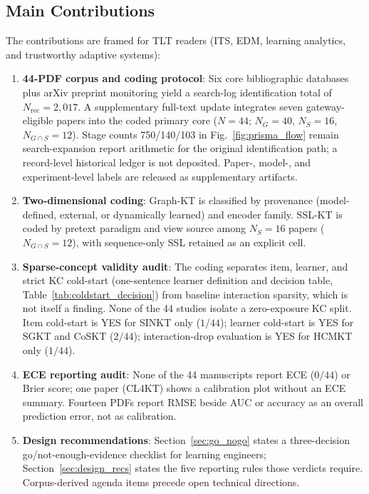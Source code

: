 \documentclass[lettersize,journal]{IEEEtran}
\begin{document}
\subsection{Main Contributions}
The contributions are framed for TLT readers (ITS, EDM, learning analytics, and trustworthy adaptive systems):
\begin{enumerate}
    \item \textbf{44-PDF corpus and coding protocol}: Six core bibliographic databases plus arXiv preprint monitoring yield a search-log identification total of $N_{\mathrm{rec}}=2{,}017$. A supplementary full-text update integrates seven gateway-eligible papers into the coded primary core ($N=44$; $N_G=40$, $N_S=16$, $N_{G \cap S}=12$). Stage counts 750/140/103 in Fig.~\ref{fig:prisma_flow} remain search-expansion report arithmetic for the original identification path; a record-level historical ledger is not deposited. Paper-, model-, and experiment-level labels are released as supplementary artifacts.
    \item \textbf{Two-dimensional coding}: Graph-KT is classified by provenance (model-defined, external, or dynamically learned) and encoder family. SSL-KT is coded by pretext paradigm and view source among $N_S=16$ papers ($N_{G\cap S}=12$), with sequence-only SSL retained as an explicit cell.
    \item \textbf{Sparse-concept validity audit}: The coding separates item, learner, and strict KC cold-start (one-sentence learner definition and decision table, Table~\ref{tab:coldstart_decision}) from baseline interaction sparsity, which is not itself a finding. None of the 44 studies isolate a zero-exposure KC split. Item cold-start is YES for SINKT only ($1/44$); learner cold-start is YES for SGKT and CoSKT ($2/44$); interaction-drop evaluation is YES for HCMKT only ($1/44$).
    \item \textbf{ECE reporting audit}: None of the 44 manuscripts report ECE ($0/44$) or Brier score; one paper (CL4KT) shows a calibration plot without an ECE summary. Fourteen PDFs report RMSE beside AUC or accuracy as an overall prediction error, not as calibration.
    \item \textbf{Design recommendations}: Section~\ref{sec:go_nogo} states a three-decision go/not-enough-evidence checklist for learning engineers; Section~\ref{sec:design_recs} states the five reporting rules those verdicts require. Corpus-derived agenda items precede open technical directions.
\end{enumerate}
\end{document}
